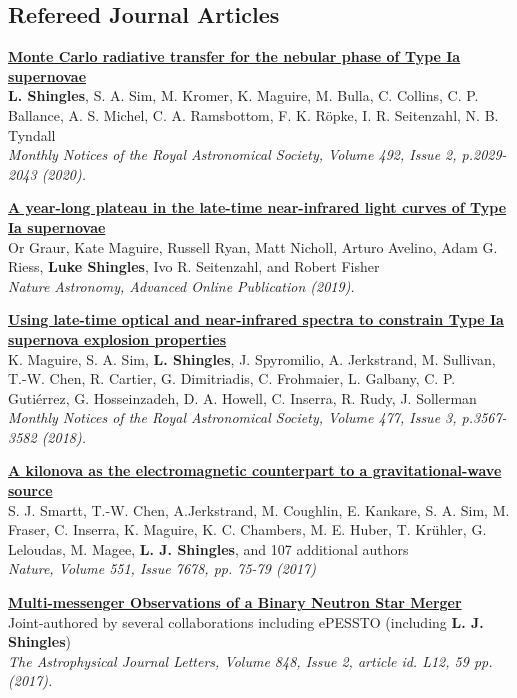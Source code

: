 \documentclass[11pt]{res} %
\newcommand{\highlight}[1]{\textbf{#1}}
\newcommand{\articletitle}[1]{{\textbf{\color{black} #1}}\\}
\newcommand{\articleauthors}[1]{#1\\}
\newcommand{\articlejournalref}[1]{\textit{#1}}
\begin{document}
\begin{resume}
\section{Refereed Journal Articles}

\articletitle{\href{https://ui.adsabs.harvard.edu/abs/2020MNRAS.492.2029S}{Monte Carlo radiative transfer for the nebular phase of Type Ia supernovae}}
\articleauthors{\highlight{L. Shingles}, S. A. Sim, M. Kromer, K. Maguire, M. Bulla, C. Collins, C. P. Ballance, A. S. Michel, C. A. Ramsbottom, F. K. R\"opke, I. R. Seitenzahl, N. B. Tyndall}
\articlejournalref{Monthly Notices of the Royal Astronomical Society, Volume 492, Issue 2, p.2029-2043 (2020).}

\articletitle{\href{https://ui.adsabs.harvard.edu/abs/2019NatAs.tmp..463G}{A year-long plateau in the late-time near-infrared light curves of Type Ia supernovae}}
\articleauthors{Or Graur, Kate Maguire, Russell Ryan, Matt Nicholl, Arturo Avelino, Adam G. Riess, \highlight{Luke Shingles}, Ivo R. Seitenzahl, and Robert Fisher}
\articlejournalref{Nature Astronomy, Advanced Online Publication (2019).}

\articletitle{\href{http://adsabs.harvard.edu/abs/2018MNRAS.477.3567M}{Using late-time optical and near-infrared spectra to constrain Type Ia supernova explosion properties}}
\articleauthors{K. Maguire, S. A. Sim, \highlight{L. Shingles}, J. Spyromilio, A. Jerkstrand, M. Sullivan, T.-W. Chen, R. Cartier, G. Dimitriadis, C. Frohmaier, L. Galbany, C. P. Gutiérrez, G. Hosseinzadeh, D. A. Howell, C. Inserra, R. Rudy, J. Sollerman}
\articlejournalref{Monthly Notices of the Royal Astronomical Society, Volume 477, Issue 3, p.3567-3582 (2018).}

\articletitle{\href{http://adsabs.harvard.edu/abs/2017Natur.551...75S}{A kilonova as the electromagnetic counterpart to a gravitational-wave source}}
\articleauthors{S. J. Smartt, T.-W. Chen, A.Jerkstrand, M. Coughlin, E. Kankare, S. A. Sim, M. Fraser, C. Inserra, K. Maguire, K. C. Chambers,
M. E. Huber, T. Kr\"uhler, G. Leloudas, M. Magee, \highlight{L. J. Shingles}, and 107 additional authors}
\articlejournalref{Nature, Volume 551, Issue 7678, pp. 75-79 (2017)}

\articletitle{\href{http://adsabs.harvard.edu/abs/2017ApJ...848L..12A}{Multi-messenger Observations of a Binary Neutron Star Merger}}
\articleauthors{Joint-authored by several collaborations including ePESSTO (including \highlight{L. J. Shingles})}
\articlejournalref{The Astrophysical Journal Letters, Volume 848, Issue 2, article id. L12, 59 pp. (2017).}


\end{resume}
\end{document}
